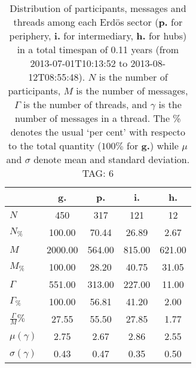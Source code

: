 \begin{table}[h!]
\begin{center}
\begin{tabular}{| l || c | c | c | c |}\hline
 & {\bf g.} & {\bf p.} & {\bf i.} & {\bf h.} \\\hline\hline
$N$ & 450  & 317  & 121  & 12 \\
$N_{\%}$ & 100.00  & 70.44  & 26.89  & 2.67 \\\hline
$M$ & 2000.00  & 564.00  & 815.00  & 621.00 \\
$M_{\%}$ & 100.00  & 28.20  & 40.75  & 31.05 \\\hline
$\Gamma$ & 551.00  & 313.00  & 227.00  & 11.00 \\
$\Gamma_{\%}$ & 100.00  & 56.81  & 41.20  & 2.00 \\\hline
$\frac{\Gamma}{M}\%$ & 27.55  & 55.50  & 27.85  & 1.77 \\
$\mu(\gamma)$ & 2.75  & 2.67  & 2.86  & 2.55 \\
$\sigma(\gamma)$ & 0.43  & 0.47  & 0.35  & 0.50 \\\hline
\end{tabular}
\caption{Distribution of participants, messages and threads among each Erd\"os sector ({\bf p.} for periphery, {\bf i.} for intermediary, 
    {\bf h.} for hubs) in a total timespan of 0.11 years (from 2013-07-01T10:13:52 to 2013-08-12T08:55:48). $N$ is the number of participants, $M$ is the number of messages, $\Gamma$ is the number of threads, and $\gamma$ is the number of messages in a thread.
    The \% denotes the usual `per cent' with respecto to the total quantity ($100\%$ for {\bf g.})
    while $\mu$ and $\sigma$ denote mean and standard deviation. TAG: 6}
\end{center}
\end{table}